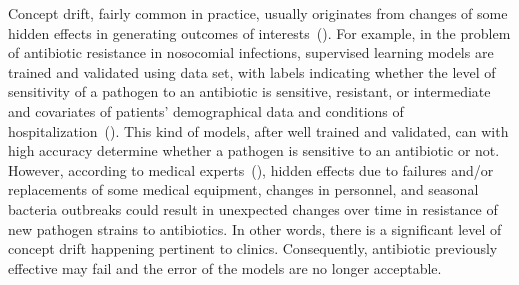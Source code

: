 \documentclass[twoside,11pt]{article}
\begin{document}
Concept drift, fairly common in practice, usually originates from changes of some hidden effects in generating outcomes of interests~(\cite{tsymbal2008dynamic,vzliobaite2012beating,widmer1996learning,kukar2003drifting,donoho2004early,vzliobaite2016overview}). For example, in the problem of antibiotic resistance in nosocomial infections, supervised learning models are trained and validated using data set, with labels indicating whether the level of sensitivity of a pathogen to an antibiotic is sensitive, resistant, or intermediate and covariates of patients' demographical data and conditions of hospitalization~(\cite{pechenizkiy2005knowledge}). This kind of models, after well trained and validated, can with high accuracy determine whether a pathogen is sensitive to an antibiotic or not. However, according to medical experts~(\cite{kukar2003drifting}), hidden effects due to failures and/or replacements of some medical equipment, changes in personnel, and seasonal bacteria outbreaks could result in unexpected changes over time in resistance of new pathogen strains to antibiotics. In other words, there is a significant level of concept drift happening pertinent to clinics. Consequently, antibiotic previously effective may fail and the error of the models are no longer acceptable. 

\end{document}
